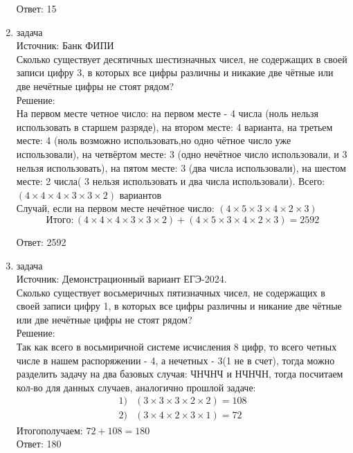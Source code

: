 \documentclass[a4paper,14pt]{extreport} %
\begin{document}
\begin{center}
\begin{enumerate}
						 Ответ: 15
						 
						 \item {\large задача  }\\
						 Источник: Банк ФИПИ\\
						 \vspace{15pt}
						 Сколько существует десятичных шестизначных чисел, не содержащих в своей записи цифру 3, в которых все цифры различны и никакие две чётные или две нечётные цифры не стоят рядом?
						 \\
						 \vspace{15pt}
						 Решение:\\
						 На первом месте четное число:  на первом месте - 4 числа (ноль нельзя использовать в старшем разряде), на втором месте: 4 варианта, на третьем месте: 4 (ноль возможно использовать,но одно чётное число уже использовали), на четвёртом месте: 3 (одно нечётное число использовали, и 3 нельзя использовать), на пятом месте: 3 (два числа использовали), на шестом месте: 2 числа( 3 нельзя использовать и два числа использовали). Всего: $(4\times4\times4\times3\times3\times2)$ вариантов\\
						 Случай, если на первом месте нечётное число: $(4\times5\times3\times4\times2\times3)$
						 \begin{equation}
						 	Итого: (4\times4\times4\times3\times3\times2) + (4\times5\times3\times4\times2\times3) = 2592
						 \end{equation}
						 
						 Ответ: 2592
						 
						 
						  \item {\large задача  }\\
						 Источник: Демонстрационный вариант ЕГЭ-2024.\\
						 \vspace{15pt}
						 Сколько существует восьмеричных пятизначных чисел, не содержащих в своей записи цифру 1, в которых все цифры различны и никание две чётные или две нечётные цифры не стоят рядом?
						 \\
						 \vspace{15pt}
						 Решение:\\
						 Так как всего в восьмиричной системе исчисления 8 цифр, то всего четных числе в нашем распоряжении - 4, а нечетных - 3(1 не в счет), тогда можно разделить задачу на два базовых случая: ЧНЧНЧ и НЧНЧН, тогда посчитаем кол-во для данных случаев, аналогично прошлой задаче:
						 \begin{align}
						 	1)& (3\times3\times3\times2\times2) = 108 \\
						 	2)& (3\times4\times2\times3\times1) = 72 
						 \end{align}
						 Итого\space получаем: $72 + 108 = 180$\\
						 Ответ: 180
				\end{enumerate}
			\end{center}
			



	
	
\end{document}
